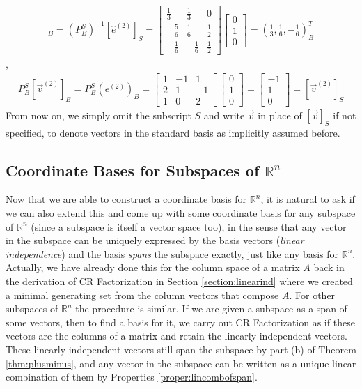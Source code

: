 \begin{solution}
{\begin{align*}
[\hat{e}^{(2)}]_B =
(P_B^S)^{-1} [\hat{e}^{(2)}]_S =
\begin{bmatrix}
\frac{1}{3} & \frac{1}{3} & 0\\ 
-\frac{5}{6} & \frac{1}{6} & \frac{1}{2}\\ 
-\frac{1}{6} & -\frac{1}{6} & \frac{1}{2}
\end{bmatrix}
\begin{bmatrix}
0 \\
1 \\
0
\end{bmatrix}
=
(\frac{1}{3}, \frac{1}{6}, -\frac{1}{6})_B^T
\end{align*}},
\begin{align*}
P_B^S [\vec{v}^{(2)}]_B =
P_B^S (e^{(2)})_B =
\begin{bmatrix}
1 & -1 & 1 \\
2 & 1 & -1 \\
1 & 0 & 2
\end{bmatrix}
\begin{bmatrix}
0 \\
1 \\
0
\end{bmatrix}   
=
\begin{bmatrix}
-1 \\
1 \\
0
\end{bmatrix}
= [\vec{v}^{(2)}]_S
\end{align*}
From now on, we simply omit the subscript $S$ and write $\vec{v}$ in place of $[\vec{v}]_S$ if not specified, to denote vectors in the standard basis as implicitly assumed before.
\end{solution}

\subsection{Coordinate Bases for Subspaces of $\mathbb{R}^n$}
\label{section:subspacebasis}

Now that we are able to construct a coordinate basis for $\mathbb{R}^n$, it is natural to ask if we can also extend this and come up with some coordinate basis for any subspace of $\mathbb{R}^n$ (since a subspace is itself a vector space too), in the sense that any vector in the subspace can be uniquely expressed by the basis vectors (\textit{linear independence}) and the basis \textit{spans} the subspace exactly, just like any basis for $\mathbb{R}^n$. Actually, we have already done this for the column space of a matrix $A$ back in the derivation of CR Factorization in Section \ref{section:linearind} where we created a minimal generating set from the column vectors that compose $A$. For other subspaces of $\mathbb{R}^n$ the procedure is similar. If we are given a subspace as a span of some vectors, then to find a basis for it, we carry out CR Factorization as if these vectors are the columns of a matrix and retain the linearly independent vectors. These linearly independent vectors still span the subspace by part (b) of Theorem \ref{thm:plusminus}, and any vector in the subspace can be written as a unique linear combination of them by Properties \ref{proper:lincombofspan}. 

